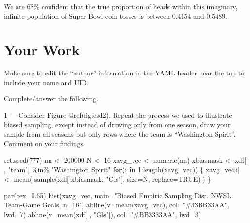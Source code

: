 \documentclass[
]{article}
\newenvironment{Shaded}{\begin{snugshade}}{\end{snugshade}}
\newcommand{\AttributeTok}[1]{\textcolor[rgb]{0.77,0.63,0.00}{#1}}
\newcommand{\ConstantTok}[1]{\textcolor[rgb]{0.00,0.00,0.00}{#1}}
\newcommand{\ControlFlowTok}[1]{\textcolor[rgb]{0.13,0.29,0.53}{\textbf{#1}}}
\newcommand{\DecValTok}[1]{\textcolor[rgb]{0.00,0.00,0.81}{#1}}
\newcommand{\FloatTok}[1]{\textcolor[rgb]{0.00,0.00,0.81}{#1}}
\newcommand{\FunctionTok}[1]{\textcolor[rgb]{0.00,0.00,0.00}{#1}}
\newcommand{\NormalTok}[1]{#1}
\newcommand{\OtherTok}[1]{\textcolor[rgb]{0.56,0.35,0.01}{#1}}
\newcommand{\SpecialCharTok}[1]{\textcolor[rgb]{0.00,0.00,0.00}{#1}}
\newcommand{\StringTok}[1]{\textcolor[rgb]{0.31,0.60,0.02}{#1}}
\begin{document}
~~

We are 68\% confident that the true proportion of heads within this
imaginary, infinite population of Super Bowl coin tosses is between
0.4154 and 0.5489.

\newpage

\hypertarget{your-work}{%
\section{Your Work}\label{your-work}}

Make sure to edit the ``author'' information in the YAML header near the
top to include your name and UID.

Complete/answer the following.

1 --- Consider Figure @ref(fig:esd2). Repeat the process we used to
illustrate biased sampling, except instead of drawing only from one
season, draw your sample from all seasons but only rows where the team
is ``Washington Spirit''. Comment on your findings.

\begin{Shaded}
\begin{Highlighting}[]
\FunctionTok{set.seed}\NormalTok{(}\DecValTok{777}\NormalTok{)}
\NormalTok{nn }\OtherTok{\textless{}{-}} \DecValTok{200000}
\NormalTok{N }\OtherTok{\textless{}{-}} \DecValTok{16}
\NormalTok{xavg\_vec }\OtherTok{\textless{}{-}} \FunctionTok{numeric}\NormalTok{(nn)}
\NormalTok{xbiasmask }\OtherTok{\textless{}{-}}\NormalTok{ xdf[ , }\StringTok{"team"}\NormalTok{] }\SpecialCharTok{\%in\%} \StringTok{"Washington Spirit"}
\ControlFlowTok{for}\NormalTok{(i }\ControlFlowTok{in} \DecValTok{1}\SpecialCharTok{:}\FunctionTok{length}\NormalTok{(xavg\_vec)) \{}
\NormalTok{xavg\_vec[i] }\OtherTok{\textless{}{-}} \FunctionTok{mean}\NormalTok{( }\FunctionTok{sample}\NormalTok{(xdf[ xbiasmask, }\StringTok{"Gls"}\NormalTok{], }\AttributeTok{size=}\NormalTok{N, }\AttributeTok{replace=}\ConstantTok{TRUE}\NormalTok{) )}
\NormalTok{\}}

\FunctionTok{par}\NormalTok{(}\AttributeTok{cex=}\FloatTok{0.65}\NormalTok{)}
\FunctionTok{hist}\NormalTok{(xavg\_vec, }\AttributeTok{main=}\StringTok{"Biased Empiric Sampling Dist. NWSL Team{-}Game Goals, n=16"}\NormalTok{)}
\FunctionTok{abline}\NormalTok{(}\AttributeTok{v=}\FunctionTok{mean}\NormalTok{(xavg\_vec), }\AttributeTok{col=}\StringTok{"\#33BB33AA"}\NormalTok{, }\AttributeTok{lwd=}\DecValTok{7}\NormalTok{)}
\FunctionTok{abline}\NormalTok{(}\AttributeTok{v=}\FunctionTok{mean}\NormalTok{(xdf[ , }\StringTok{"Gls"}\NormalTok{]), }\AttributeTok{col=}\StringTok{"\#BB3333AA"}\NormalTok{, }\AttributeTok{lwd=}\DecValTok{3}\NormalTok{)}
\end{Highlighting}
\end{Shaded}
\end{document}
